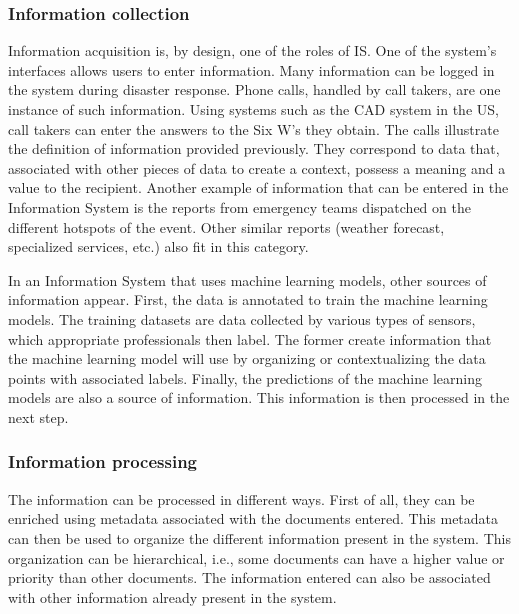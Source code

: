 \subsubsection{Information collection}
Information acquisition is, by design, one of the roles of IS.
One of the system's interfaces allows users to enter information.
Many information can be logged in the system during disaster response.
Phone calls, handled by call takers, are one instance of such information.
Using systems such as the CAD system in the US, call takers can enter the answers to the
Six W's they obtain.
The calls illustrate the definition of information provided previously.
They correspond to data that, associated with other pieces of data to create a context, possess a meaning and a value to the recipient.
Another example of information that can be entered in the Information System is the reports from emergency teams dispatched on the different hotspots of the event.
Other similar reports (weather forecast, specialized services, etc.) also fit in this category.

In an Information System that uses machine learning models, other sources of information appear.
First, the data is annotated to train the machine learning models.
The training datasets are data collected by various types of sensors, which appropriate professionals then label.
The former create information that the machine learning model will use by organizing or contextualizing the data points with associated labels.
Finally, the predictions of the machine learning models are also a source of information.
This information is then processed in the next step.

\subsubsection{Information processing}
The information can be processed in different ways.
First of all, they can be enriched using metadata associated with the documents entered.
This metadata can then be used to organize the different information present in the system.
This organization can be hierarchical, i.e., some documents can have a higher value or priority than other documents.
The information entered can also be associated with other information already present in the system.

